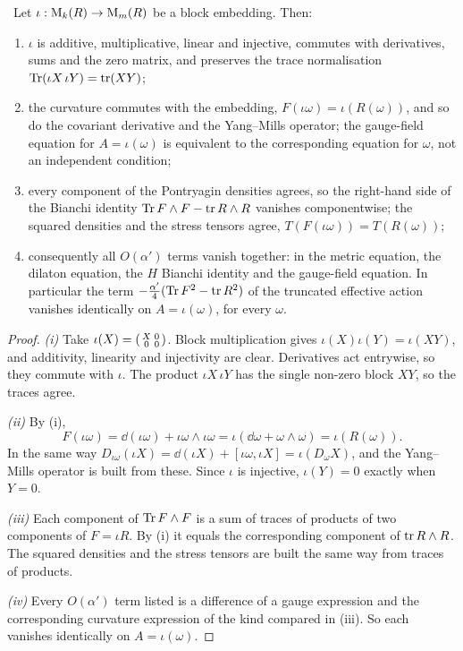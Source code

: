 \begin{theorem}\label{thm:stdembed}\ver\
Let $\iota:\mathrm{M}_k(R)\to\mathrm{M}_m(R)$ be a block embedding. Then:
\begin{enumerate}[label=(\roman*)]
\item $\iota$ is additive, multiplicative, linear and injective, commutes with derivatives, sums and the zero matrix, and preserves the trace normalisation $\operatorname{Tr}(\iota X\,\iota Y)=\operatorname{tr}(XY)$;
\item the curvature commutes with the embedding, $F(\iota\omega)=\iota(R(\omega))$, and so do the covariant derivative and the Yang--Mills operator; the gauge-field equation for $A=\iota(\omega)$ is equivalent to the corresponding equation for $\omega$, not an independent condition;
\item every component of the Pontryagin densities agrees, so the right-hand side of the Bianchi identity $\operatorname{Tr} F\wedge F-\operatorname{tr} R\wedge R$ vanishes componentwise; the squared densities and the stress tensors agree, $T(F(\iota\omega))=T(R(\omega))$;
\item consequently all $O(\alpha')$ terms vanish together: in the metric equation, the dilaton equation, the $H$ Bianchi identity and the gauge-field equation. In particular the term $-\frac{\alpha'}4(\operatorname{Tr} F^2-\operatorname{tr} R^2)$ of the truncated effective action vanishes identically on $A=\iota(\omega)$, for every $\omega$.
\end{enumerate}
\end{theorem}
\begin{proof}
\emph{(i)} Take $\iota(X)=\begin{psmallmatrix}X&0\\0&0\end{psmallmatrix}$. Block multiplication gives $\iota(X)\iota(Y)=\iota(XY)$, and additivity, linearity and injectivity are clear. Derivatives act entrywise, so they commute with $\iota$. The product $\iota X\,\iota Y$ has the single non-zero block $XY$, so the traces agree.

\emph{(ii)} By (i),
\[
F(\iota\omega)=\dd(\iota\omega)+\iota\omega\wedge\iota\omega=\iota(\dd\omega+\omega\wedge\omega)=\iota(R(\omega)).
\]
In the same way $D_{\iota\omega}(\iota X)=\dd(\iota X)+[\iota\omega,\iota X]=\iota(D_\omega X)$, and the Yang--Mills operator is built from these. Since $\iota$ is injective, $\iota(Y)=0$ exactly when $Y=0$.

\emph{(iii)} Each component of $\operatorname{Tr} F\wedge F$ is a sum of traces of products of two components of $F=\iota R$. By (i) it equals the corresponding component of $\operatorname{tr} R\wedge R$. The squared densities and the stress tensors are built the same way from traces of products.

\emph{(iv)} Every $O(\alpha')$ term listed is a difference of a gauge expression and the corresponding curvature expression of the kind compared in (iii). So each vanishes identically on $A=\iota(\omega)$.
\end{proof}


